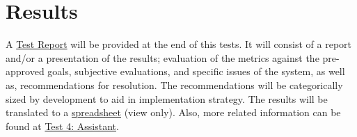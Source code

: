
\section{Results}
\label{sec:sec011}

A \hyperlink{https://github.com/mida-project/research-reports}{Test Report} will be provided at the end of this tests. It will consist of a report and/or a presentation of the results; evaluation of the metrics against the pre-approved goals, subjective evaluations, and specific issues of the system, as well as, recommendations for resolution. The recommendations will be categorically sized by development to aid in implementation strategy. The results will be translated to a \hyperlink{https://docs.google.com/spreadsheets/d/1CoPLONnINdBWryGs7SBRuPZA-DnQ0t_yzx3u8ym0UoI/edit?usp=sharing}{spreadsheet} (view only). Also, more related information can be found at \hyperlink{https://github.com/MIMBCD-UI/prototype-breast-screening/wiki/User-Test-Evaluation}{Test 4: Assistant}.